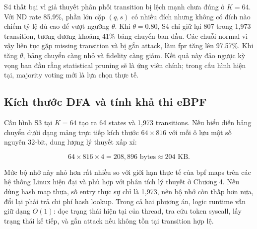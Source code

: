 \documentclass[../main.tex]{subfiles}
\begin{document}
S4 thất bại vì giả thuyết phân phối transition bị lệch mạnh chưa đúng
ở $K=64$. Với
ND rate 85.9\%, phần lớn cặp $(q, s)$ có nhiều đích nhưng không có
đích nào chiếm tỷ lệ
đủ cao để vượt ngưỡng $\theta$. Khi $\theta = 0.80$, S4 chỉ giữ lại
807 trong 1,973
transition, tương đương khoảng 41\% bảng chuyển ban đầu. Các chuỗi
normal vì vậy liên
tục gặp missing transition và bị gắn attack, làm \gls{fpr} tăng lên
97.57\%. Khi tăng $\theta$,
bảng chuyển càng nhỏ và fidelity càng giảm. Kết quả này đảo ngược kỳ
vọng ban đầu rằng
statistical pruning sẽ là ứng viên chính; trong cấu hình hiện tại,
majority voting mới
là lựa chọn thực tế.

\subsection{Kích thước DFA và tính khả thi eBPF}
\label{subsec:p3_ebpf_feasibility}

Cấu hình S3 tại $K=64$ tạo ra 64 states và 1,973 transitions. Nếu
biểu diễn bảng chuyển
dưới dạng mảng trực tiếp kích thước $64 \times 816$ với mỗi ô lưu một
số nguyên 32-bit,
dung lượng lý thuyết xấp xỉ:

\begin{equation}
  \label{eq:p3_bpf_memory}
  64 \times 816 \times 4 = 208{,}896 \text{ bytes} \approx 204 \text{ KB}.
\end{equation}

Mức bộ nhớ này nhỏ hơn rất nhiều so với giới hạn thực tế của \gls{bpf} maps
trên các hệ thống
Linux hiện đại và phù hợp với phân tích lý thuyết ở Chương 4. Nếu
dùng hash map thưa,
số entry thực sự chỉ là 1,973, nên bộ nhớ còn thấp hơn nữa, đổi lại
phải trả chi phí
hash lookup. Trong cả hai phương án, logic runtime vẫn giữ dạng
$O(1)$: đọc trạng thái
hiện tại của thread, tra cứu token \gls{syscall}, lấy trạng thái kế tiếp,
và gắn attack nếu không
tồn tại transition hợp lệ.
\end{document}
